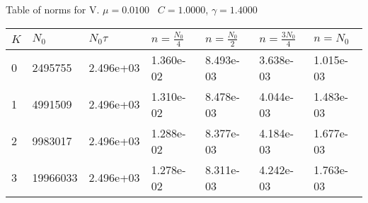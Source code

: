 \begin{center}
Table of norms for V. $\mu = 0.0100$ \, $C = 1.0000$, $\gamma = 1.4000$
  
\begin{tabular}{|p{0.8in}|p{0.8in}|p{0.8in}|p{0.8in}|p{0.8in}|p{0.8in}|p{0.8in}|} \hline
$K$ &$N_0$ &$N_0 \tau$ &$n = \frac{N_0}{4}$ &$n = \frac{N_0}{2}$ &$n = \frac{3N_0}{4}$ &$n = N_0$ \\ \hline 
0 &2495755 &2.496e+03 &1.360e-02 &8.493e-03 &3.638e-03 &1.015e-03 \\ \hline 
1 &4991509 &2.496e+03 &1.310e-02 &8.478e-03 &4.044e-03 &1.483e-03 \\ \hline 
2 &9983017 &2.496e+03 &1.288e-02 &8.377e-03 &4.184e-03 &1.677e-03 \\ \hline 
3 &19966033 &2.496e+03 &1.278e-02 &8.311e-03 &4.242e-03 &1.763e-03 \\ \hline 

\end{tabular}\\[20pt]
\end{center}
